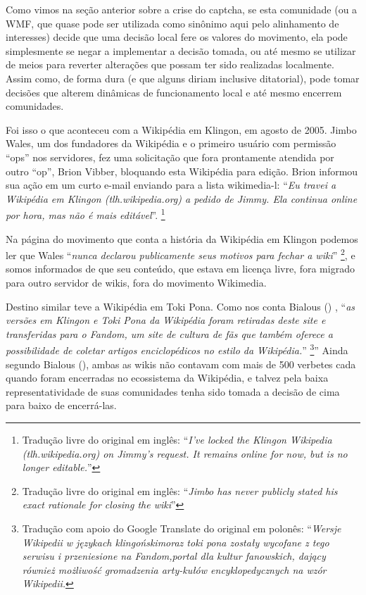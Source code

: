 Como vimos na seção anterior sobre a crise do captcha, se esta comunidade (ou a WMF, que quase pode ser utilizada como sinônimo aqui pelo alinhamento de interesses) decide que uma decisão local fere os valores do movimento, ela pode simplesmente se negar a implementar a decisão tomada, ou até mesmo se utilizar de meios para reverter alterações que possam ter sido realizadas localmente. Assim como, de forma dura (e que alguns diriam inclusive ditatorial), pode tomar decisões que alterem dinâmicas de funcionamento local e até mesmo encerrem comunidades.

Foi isso o que aconteceu com a Wikipédia em Klingon, em agosto de 2005. Jimbo Wales, um dos fundadores da Wikipédia e o primeiro usuário com permissão ``ops'' nos servidores, fez uma solicitação que fora prontamente atendida por outro ``op'', Brion Vibber, bloquando esta Wikipédia para edição. Brion informou sua ação em um curto e-mail enviando para a lista wikimedia-l: ``\textit{Eu travei a Wikipédia em Klingon (tlh.wikipedia.org) a pedido de Jimmy. Ela continua online por hora, mas não é mais editável}''. \footnote{Tradução livre do original em inglês: ``\textit{I've locked the Klingon Wikipedia (tlh.wikipedia.org) on Jimmy's request. It remains online for now, but is no longer editable.}'' }

Na página do movimento que conta a história da Wikipédia em Klingon podemos ler que Wales ``\textit{nunca declarou publicamente seus motivos para fechar a wiki}'' \footnote{Tradução livre do original em inglês: ``\textit{Jimbo has never publicly stated his exact rationale for closing the wiki}'' }, e somos informados de que seu conteúdo, que estava em licença livre, fora migrado para outro servidor de wikis, fora do movimento Wikimedia.

Destino similar teve a Wikipédia em Toki Pona. Como nos conta Bialous (\citeyear[p.171]{bialous_sztuczne_2017}) , ``\textit{as versões em Klingon e Toki Pona da Wikipédia foram retiradas deste site e transferidas para o Fandom, um site de cultura de fãs que também oferece a possibilidade de coletar artigos enciclopédicos no estilo da Wikipédia.}'' \footnote{Tradução com apoio do Google Translate do original em polonês: ``\textit{Wersje Wikipedii w językach klingońskimoraz toki pona zostały wycofane z tego serwisu i przeniesione na Fandom,portal dla kultur fanowskich, dający również możliwość gromadzenia arty-kułów encyklopedycznych na wzór Wikipedii.}}'' Ainda segundo Bialous (\citeyear[p.171]{bialous_sztuczne_2017}), ambas as wikis não contavam com mais de 500 verbetes cada quando foram encerradas no ecossistema da Wikipédia, e talvez pela baixa representatividade de suas comunidades tenha sido tomada a decisão de cima para baixo de encerrá-las.

